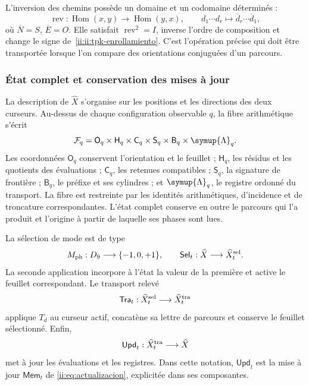 L'inversion des chemins possède un domaine et un codomaine déterminés :
\[
 \operatorname{rev}:\operatorname{Hom}(x,y)
 \longrightarrow\operatorname{Hom}(y,x),\qquad
 d_1\cdots d_r\longmapsto\overline d_r\cdots\overline d_1,
\]
où \(\overline N=S\), \(\overline E=O\). Elle satisfait \(\operatorname{rev}^2=I\), inverse l'ordre de composition et change le signe de~\eqref{ii:ii:tpk-enrollamiento}. C'est l'opération précise qui doit être transportée lorsque l'on compare des orientations conjuguées d'un parcours.

\subsubsection{État complet et conservation des mises à jour}

La description de \(\widehat X\) s'organise sur les positions et les directions des deux curseurs. Au-dessus de chaque configuration observable \(q\), la fibre arithmétique s'écrit
\begin{equation}
 \mathcal F_q=
 \mathsf O_q\times\mathsf H_q\times\mathsf C_q\times
 \mathsf S_q\times\mathsf B_q\times\symup{\Lambda}_q.
 \label{ii:ii:tpk-fibra}
\end{equation}
Les coordonnées \(\mathsf O_q\) conservent l'orientation et le feuillet ; \(\mathsf H_q\), les résidus et les quotients des évaluations ; \(\mathsf C_q\), les retenues compatibles ; \(\mathsf S_q\), la signature de frontière ; \(\mathsf B_q\), le préfixe et ses cylindres ; et \(\symup{\Lambda}_q\), le registre ordonné du transport. La fibre est restreinte par les identités arithmétiques, d'incidence et de troncature correspondantes. L'état complet conserve en outre le parcours qui l'a produit et l'origine à partir de laquelle ses phases sont lues.

La sélection de mode est de type
\[
 M_{\rm ph}:D_9\longrightarrow\{-1,0,+1\},\qquad
 \mathsf{Sel}_t:\widehat X\longrightarrow\widehat X^{\rm sel}_t.
\]
La seconde application incorpore à l'état la valeur de la première et active le feuillet correspondant. Le transport relevé
\[
 \mathsf{Tra}_t:\widehat X^{\rm sel}_t
 \longrightarrow\widehat X^{\rm tra}_t
\]
applique \(T_d\) au curseur actif, concatène sa lettre de parcours et conserve le feuillet sélectionné. Enfin,
\[
 \mathsf{Upd}_t:\widehat X^{\rm tra}_t\longrightarrow\widehat X
\]
met à jour les évaluations et les registres. Dans cette notation, \(\mathsf{Upd}_t\) est la mise à jour \(\mathsf{Mem}_t\) de \eqref{ii:eq:actualizacion}, explicitée dans ses composantes.


